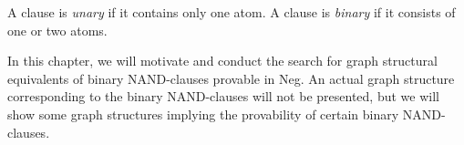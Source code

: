\begin{definition}
  A clause is \textit{unary} if it contains only one atom.
  A clause is \textit{binary} if it consists of one or two atoms.
\end{definition}
In this chapter, we will motivate and conduct the search for graph structural equivalents of binary NAND-clauses provable in Neg.
An actual graph structure corresponding to the binary NAND-clauses will not be presented, but we will show some graph structures implying the provability of certain binary NAND-clauses.

